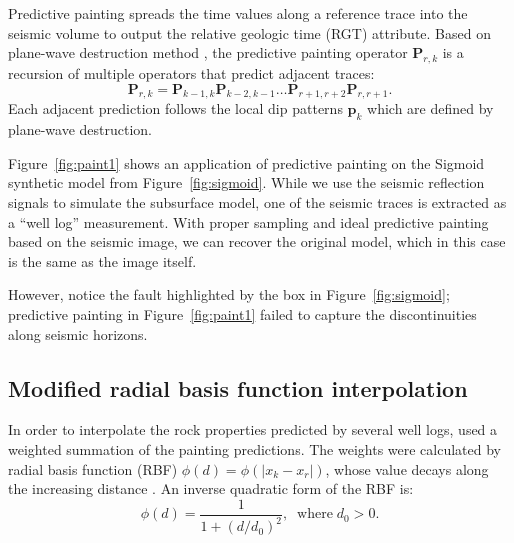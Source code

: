 Predictive painting \cite[]{pred} spreads the time values along a reference trace into the seismic volume to output the relative geologic time (RGT) attribute.
Based on plane-wave destruction method \cite[]{pwd}, the predictive painting operator $\mathbf{P}_{r,k}$ is a recursion of multiple operators that predict adjacent traces:
\begin{equation}
    \mathbf{P}_{r,k} = \mathbf{P}_{k-1,k}\mathbf{P}_{k-2,k-1}\ldots
                       \mathbf{P}_{r+1,r+2}\mathbf{P}_{r,r+1}.
\end{equation}
Each adjacent prediction follows the local dip patterns $\mathbf{p}_k$ which are defined by plane-wave destruction.

Figure~\ref{fig:paint1} shows an application of predictive painting on the Sigmoid synthetic model \cite[]{claerbout} from Figure~\ref{fig:sigmoid}.
While we use the seismic reflection signals to simulate the subsurface model, one of the seismic traces is extracted as a ``well log'' measurement.
With proper sampling and ideal predictive painting based on the seismic image, we can recover the original model, which in this case is the same as the image itself.



However, notice the fault highlighted by the box in Figure~\ref{fig:sigmoid}; predictive painting in Figure~\ref{fig:paint1} failed to capture the discontinuities along seismic horizons.

\subsection{Modified radial basis function interpolation}
In order to interpolate the rock properties predicted by several well logs, \cite{karimi} used a weighted summation of the painting predictions.
The weights were calculated by radial basis function (RBF) $\phi(d) = \phi(\vert x_k-x_r\vert)$, whose value decays along the increasing distance \cite[]{rbf}.
An inverse quadratic form of the RBF is:
\begin{equation}
    \phi(d) = \frac{1}{1 + \left(d/d_0\right)^2},\;\;\mathrm{where}\;d_0>0.
\end{equation}

